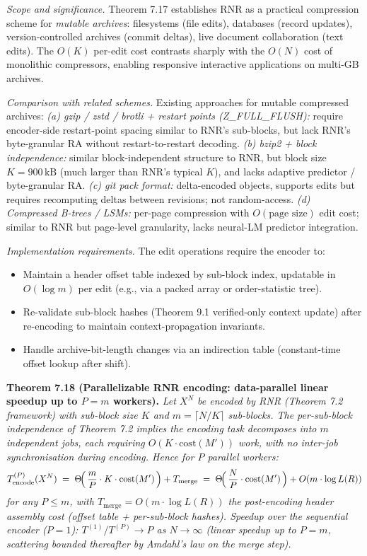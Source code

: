\documentclass[
]{article}
\begin{document}
\emph{Scope and significance.} Theorem 7.17 establishes RNR as a
practical compression scheme for \emph{mutable archives}: filesystems
(file edits), databases (record updates), version-controlled archives
(commit deltas), live document collaboration (text edits). The
$O(K)$ per-edit cost contrasts sharply with the $O(N)$ cost of
monolithic compressors, enabling responsive interactive applications
on multi-GB archives.

\emph{Comparison with related schemes.} Existing approaches for
mutable compressed archives:
\emph{(a) gzip / zstd / brotli + restart points (Z\_FULL\_FLUSH):}
require encoder-side restart-point spacing similar to RNR's sub-blocks,
but lack RNR's byte-granular RA without restart-to-restart decoding.
\emph{(b) bzip2 + block independence:} similar block-independent
structure to RNR, but block size $K = 900\,\mathrm{kB}$ (much larger
than RNR's typical $K$), and lacks adaptive predictor / byte-granular RA.
\emph{(c) git pack format:} delta-encoded objects, supports edits but
requires recomputing deltas between revisions; not random-access.
\emph{(d) Compressed B-trees / LSMs:} per-page compression with
$O(\text{page size})$ edit cost; similar to RNR but page-level
granularity, lacks neural-LM predictor integration.

\emph{Implementation requirements.} The edit operations require the
encoder to:
\begin{itemize}
\item Maintain a header offset table indexed by sub-block index,
updatable in $O(\log m)$ per edit (e.g., via a packed array or
order-statistic tree).
\item Re-validate sub-block hashes (Theorem 9.1 verified-only context
update) after re-encoding to maintain context-propagation invariants.
\item Handle archive-bit-length changes via an indirection table
(constant-time offset lookup after shift).
\end{itemize}

\textbf{Theorem 7.18 (Parallelizable RNR encoding: data-parallel
linear speedup up to $P = m$ workers).}
\emph{Let $X^N$ be encoded by RNR (Theorem 7.2 framework) with sub-block
size $K$ and $m = \lceil N/K \rceil$ sub-blocks. The per-sub-block
independence of Theorem 7.2 implies the encoding task decomposes into
$m$ independent jobs, each requiring $O(K \cdot \mathrm{cost}(M'))$
work, with no inter-job synchronisation during encoding. Hence for $P$
parallel workers:}
\[
T_{\mathrm{encode}}^{(P)}(X^N)
\;=\;
\Theta\!\Bigl(\,\frac{m}{P} \cdot K \cdot \mathrm{cost}(M')\,\Bigr) + T_{\mathrm{merge}}
\;=\;
\Theta\!\Bigl(\,\frac{N}{P} \cdot \mathrm{cost}(M')\,\Bigr) + O(m \cdot \log L(R))
\]
\emph{for any $P \leq m$, with $T_{\mathrm{merge}} = O(m \cdot \log L(R))$
the post-encoding header assembly cost (offset table + per-sub-block
hashes). Speedup over the sequential encoder ($P = 1$):
$T^{(1)} / T^{(P)} \to P$ as $N \to \infty$ (linear speedup up to
$P = m$, scattering bounded thereafter by Amdahl's law on the merge
step).}
\end{document}
